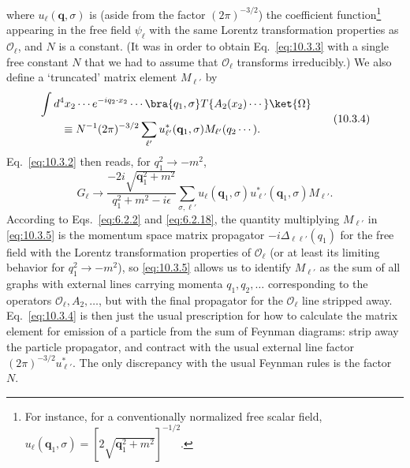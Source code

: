 where $u_\ell(\mathbf q,\sigma)$ is (aside from the factor $(2\pi)^{-3/2}$)
the coefficient function\footnote{For instance, for a conventionally
normalized free scalar field,
$u_\ell(\mathbf q_1,\sigma)=[2\sqrt{\mathbf q_1^2+m^2}]^{-1/2}$.}
appearing in the free field $\psi_\ell$ with the same Lorentz transformation
properties as $\mathcal O_\ell$, and $N$ is a constant. (It was in order to
obtain Eq.~\eqref{eq:10.3.3} with a single free constant $N$ that we had to
assume that $\mathcal O_\ell$ transforms irreducibly.) We also define a
`truncated' matrix element $M_{\ell'}$ by
\begin{equation}
\begin{split}
&\int d^4x_2\cdots e^{-iq_2\cdot x_2}\cdots
\bra{q_1,\sigma}T\{A_2(x_2)\cdots\}\ket{\Omega}
\\
&\qquad\equiv N^{-1}(2\pi)^{-3/2}
\sum_{\ell'}u_{\ell'}^*(\mathbf q_1,\sigma)M_{\ell'}(q_2\cdots).
\end{split}
\tag{10.3.4}\label{eq:10.3.4}
\end{equation}
Eq.~\eqref{eq:10.3.2} then reads, for $q_1^2\to-m^2$,
\begin{equation}
G_\ell\to
\frac{-2i\sqrt{\mathbf q_1^2+m^2}}{q_1^2+m^2-i\epsilon}
\sum_{\sigma,\ell'}u_\ell(\mathbf q_1,\sigma)
u_{\ell'}^*(\mathbf q_1,\sigma)M_{\ell'}.
\tag{10.3.5}\label{eq:10.3.5}
\end{equation}
According to Eqs.~\eqref{eq:6.2.2} and \eqref{eq:6.2.18}, the quantity
multiplying $M_{\ell'}$ in \eqref{eq:10.3.5} is the momentum space matrix
propagator $-i\Delta_{\ell\ell'}(q_1)$ for the free field with the Lorentz
transformation properties of $\mathcal O_\ell$ (or at least its limiting
behavior for $q_1^2\to-m^2$), so \eqref{eq:10.3.5} allows us to identify
$M_{\ell'}$ as the sum of all graphs with external lines carrying momenta
$q_1,q_2,\ldots$ corresponding to the operators $\mathcal O_\ell,A_2,\ldots$,
but with the final propagator for the $\mathcal O_\ell$ line stripped away.
Eq.~\eqref{eq:10.3.4} is then just the usual prescription for how to calculate
the matrix element for emission of a particle from the sum of Feynman diagrams:
strip away the particle propagator, and contract with the usual external line
factor $(2\pi)^{-3/2}u_{\ell'}^*$. The only discrepancy with the usual Feynman
rules is the factor $N$.

